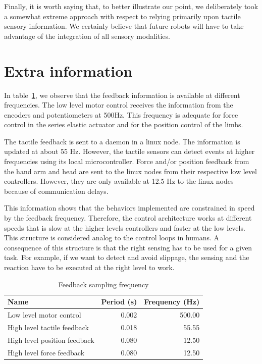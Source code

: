 Finally, it is worth saying that, to better illustrate our point,
we deliberately took a somewhat extreme approach with respect to
relying primarily upon tactile sensory information. We certainly
believe that future robots will have to take advantage of the
integration of all sensory modalities.


\newpage

\section{Extra information}
\label{sec:imp:timing}

In table~\ref{tab:feedback}, we observe that the feedback
information is available at different frequencies. The low level
motor control receives the information from the encoders and
potentiometers at 500Hz. This frequency is adequate for force
control in the series elastic actuator and for the position
control of the limbs.

The tactile feedback is sent to a daemon in a linux node. The
information is updated at about 55 Hz. However, the tactile
sensors can detect events at higher frequencies using its local
microcontroller. Force and/or position feedback from the hand arm
and head are sent to the linux nodes from their respective low
level controllers. However, they are only available at 12.5 Hz to
the linux nodes because of communication delays.

This information shows that the behaviors implemented are
constrained in speed by the feedback frequency. Therefore, the
control architecture works at different speeds that is slow at the
higher levels controllers and faster at the low levels. This
structure is considered analog to the control loops in humans. A
consequence of this structure is that the right sensing has to be
used for a given task. For example, if we want to detect and avoid
slippage, the sensing and the reaction have to be executed at the
right level to work.


\begin{table}[htb]
  \caption[Feedback sampling frequency]{Feedback sampling frequency}
  \label{tab:feedback}
  \centering
  \begin{tabular}{|l|r|r|}
    \hline
    Name& Period (s)&Frequency (Hz)\\
    \hline
    Low level motor control&0.002&500.00\\
    High level tactile feedback & 0.018 & 55.55\\
    High level position feedback &0.080 & 12.50\\
    High level force feedback &0.080 & 12.50\\

    \hline
  \end{tabular}
\end{table}


